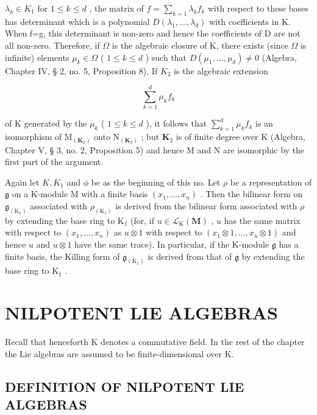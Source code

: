 \(\lambda_{k}\in K_{1}\) for \(1\leqslant k\leqslant d\) , the matrix of \(f=\sum_{k=1}\lambda_{k}f_{k}\) with respect to these bases has determinant which is a polynomial \(D(\lambda_{1},\ldots,\lambda_{d})\) with coefficients in K. When f=g, this determinant is non-zero and hence the coefficients of D are not all non-zero. Therefore, if \(\Omega\) is the algebraic closure of K, there exists (since \(\Omega\) is infinite) elements \(\mu_{k}\in\Omega\) ( \(1\leqslant k\leqslant d\) ) such that \(D(\mu_{1},\ldots,\mu_{d})\neq0\) (Algebra, Chapter IV, § 2, no. 5, Proposition 8). If \(K_{2}\) is the algebraic extension

\[
\sum_ {k = 1} ^ {d} \mu_ {k} f _ {k}
\]

of K generated by the \(\mu_{k}\) ( \(1 \leqslant k \leqslant d\) ), it follows that \(\sum_{k=1}^{d} \mu_{k} f_{k}\) is an isomorphism of \(\mathrm{M}_{(\mathbf{K}_{2})}\) onto \(\mathrm{N}_{(\mathbf{K}_{2})}\) ; but \(\mathbf{K}_{2}\) is of finite degree over K (Algebra, Chapter V, § 3, no. 2, Proposition 5) and hence M and N are isomorphic by the first part of the argument.

Again let \(K, K_{1}\) and \(\phi\) be as the beginning of this no. Let \(\rho\) be a representation of \(\mathfrak{g}\) on a K-module M with a finite basis \((x_{1},\ldots ,x_{n})\) . Then the bilinear form on \(\mathfrak{g}_{(\mathrm{K}_1)}\) associated with \(\rho_{(\mathrm{K}_1)}\) is derived from the bilinear form associated with \(\rho\) by extending the base ring to \(\mathrm{K}_1\) (for, if \(u\in \mathcal{L}_{\mathrm{K}}(\mathbf{M})\) , \(u\) has the same matrix with respect to \((x_{1},\dots,x_{n})\) as \(u\otimes 1\) with respect to \((x_{1}\otimes 1,\dots,x_{n}\otimes 1)\) and hence \(u\) and \(u\otimes 1\) have the same trace). In particular, if the K-module \(\mathfrak{g}\) has a finite basis, the Killing form of \(\mathfrak{g}_{(\mathrm{K}_1)}\) is derived from that of \(\mathfrak{g}\) by extending the base ring to \(\mathrm{K}_1\) .

\section{NILPOTENT LIE ALGEBRAS}

Recall that henceforth K denotes a commutative field. In the rest of the chapter the Lie algebras are assumed to be finite-dimensional over K.

\subsection{DEFINITION OF NILPOTENT LIE ALGEBRAS}

